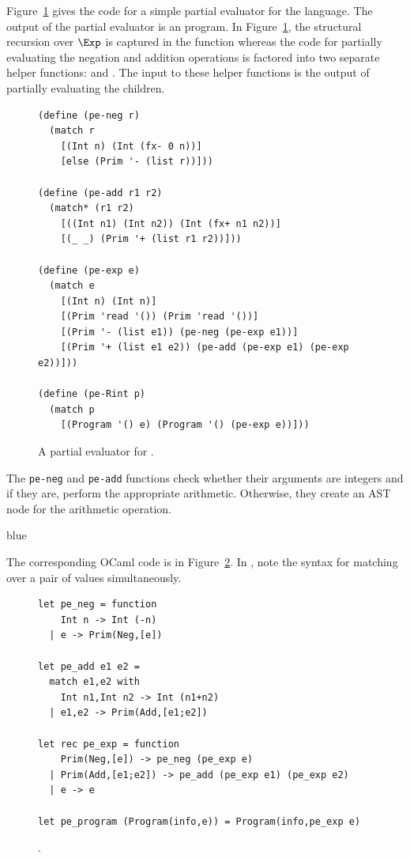 \documentclass[11pt]{book}
\newcommand{\ocaml}[1]{{\color{blue}{#1}}}
\newenvironment{ocamlx}{
  \begin{color}{blue}
}
{
  \end{color}
}
\begin{document}
Figure~\ref{fig:pe-arith} gives the code for a simple partial
evaluator for the \LangInt{} language. The output of the partial evaluator
is an \LangInt{} program. In Figure~\ref{fig:pe-arith}, the structural
recursion over $\Exp$ is captured in the  function
whereas the code for partially evaluating the negation and addition
operations is factored into two separate helper functions:
 and . The input to these helper
functions is the output of partially evaluating the children.

\begin{figure}[tp]
\begin{lstlisting}
(define (pe-neg r)
  (match r
    [(Int n) (Int (fx- 0 n))]
    [else (Prim '- (list r))]))

(define (pe-add r1 r2)
  (match* (r1 r2)
    [((Int n1) (Int n2)) (Int (fx+ n1 n2))]
    [(_ _) (Prim '+ (list r1 r2))]))

(define (pe-exp e)
  (match e
    [(Int n) (Int n)]
    [(Prim 'read '()) (Prim 'read '())]
    [(Prim '- (list e1)) (pe-neg (pe-exp e1))]
    [(Prim '+ (list e1 e2)) (pe-add (pe-exp e1) (pe-exp e2))]))

(define (pe-Rint p)
  (match p
    [(Program '() e) (Program '() (pe-exp e))]))
\end{lstlisting}
\caption{A partial evaluator for \LangInt{}.}
\label{fig:pe-arith}
\end{figure}

The \texttt{pe-neg} and \texttt{pe-add} functions check whether their
arguments are integers and if they are, perform the appropriate
arithmetic.  Otherwise, they create an AST node for the arithmetic
operation.

\begin{ocamlx}
  The corresponding OCaml code is in Figure~\ref{fig:ocaml-pe-arith}. In , note
  the syntax for matching over a pair of values simultaneously.

\begin{figure}[tp]
\begin{lstlisting}[style=ocaml]
let pe_neg = function
    Int n -> Int (-n)
  | e -> Prim(Neg,[e])

let pe_add e1 e2 = 
  match e1,e2 with
    Int n1,Int n2 -> Int (n1+n2)
  | e1,e2 -> Prim(Add,[e1;e2])

let rec pe_exp = function
    Prim(Neg,[e]) -> pe_neg (pe_exp e)
  | Prim(Add,[e1;e2]) -> pe_add (pe_exp e1) (pe_exp e2)
  | e -> e

let pe_program (Program(info,e)) = Program(info,pe_exp e)
\end{lstlisting}
\caption{\ocaml{An OCaml partial evaluator for \LangInt{}}.}
\label{fig:ocaml-pe-arith}
\end{figure}

\end{ocamlx}
\end{document}
